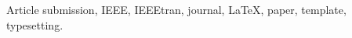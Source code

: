 \documentclass[lettersize,journal]{IEEEtran}
\begin{document}
\begin{abstract}


















\end{abstract}

\begin{IEEEkeywords}
Article submission, IEEE, IEEEtran, journal, \LaTeX, paper, template, typesetting.
\end{IEEEkeywords}
\end{document}
